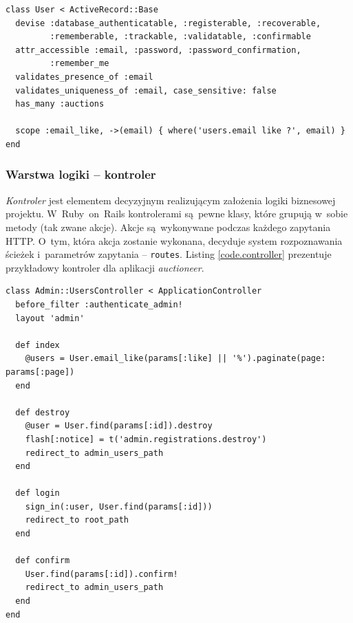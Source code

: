 \begin{lstlisting}[label={code.user}]
class User < ActiveRecord::Base
  devise :database_authenticatable, :registerable, :recoverable,
         :rememberable, :trackable, :validatable, :confirmable
  attr_accessible :email, :password, :password_confirmation,
         :remember_me
  validates_presence_of :email
  validates_uniqueness_of :email, case_sensitive: false
  has_many :auctions

  scope :email_like, ->(email) { where('users.email like ?', email) }
end
\end{lstlisting}

\subsubsection{Warstwa logiki -- kontroler}

\textit{Kontroler} jest elementem decyzyjnym realizującym założenia logiki biznesowej projektu. W~Ruby~on~Rails kontrolerami są~pewne klasy, które grupują w~sobie metody (tak zwane akcje). Akcje są~wykonywane podczas każdego zapytania HTTP. O~tym, która akcja zostanie wykonana, decyduje system rozpoznawania ścieżek i~parametrów zapytania -- \texttt{routes}. Listing \ref{code.controller} prezentuje przykładowy kontroler dla aplikacji \textit{auctioneer}.

\begin{lstlisting}[label={code.controller}]
class Admin::UsersController < ApplicationController
  before_filter :authenticate_admin!
  layout 'admin'

  def index
    @users = User.email_like(params[:like] || '%').paginate(page: params[:page])
  end

  def destroy
    @user = User.find(params[:id]).destroy
    flash[:notice] = t('admin.registrations.destroy')
    redirect_to admin_users_path
  end

  def login
    sign_in(:user, User.find(params[:id]))
    redirect_to root_path
  end

  def confirm
    User.find(params[:id]).confirm!
    redirect_to admin_users_path
  end
end
\end{lstlisting}

